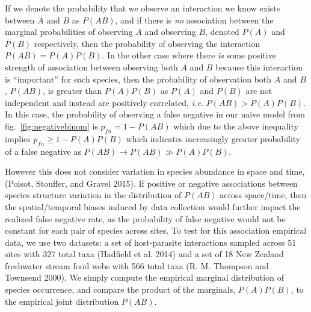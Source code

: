 \documentclass[10pt,oneside]{article}
\begin{document}
If we denote the probability that we observe an interaction we know
exists between \(A\) and \(B\) as \(P(AB)\), and if there is \emph{no}
association between the marginal probabilities of observing \(A\) and
observing \(B\), denoted \(P(A)\) and \(P(B)\) respectively, then the
probability of observing the interaction \(P(AB) = P(A)P(B)\). In the
other case where there \emph{is} some positive strength of association
between observing both \(A\) and \(B\) because this interaction is
``important'' for each species, then the probability of observation both
\(A\) and \(B\), \(P(AB)\), is greater than \(P(A)P(B)\) as \(P(A)\) and
\(P(B)\) are not independent and instead are positively correlated,
\emph{i.e.} \(P(AB) > P(A)P(B)\). In this case, the probability of
observing a false negative in our naive model from
fig.~\ref{fig:negativebinom} is \(p_{fn} = 1 - P(AB)\) which due to the
above inequality implies \(p_{fn} \geq 1 - P(A)P(B)\) which indicates
increasingly greater probability of a false negative as
\(P(AB) \to P(AB) \gg P(A)P(B)\).

However this does not consider variation in species abundance in space
and time, (Poisot, Stouffer, and Gravel 2015). If positive or negative
associations between species structure variation in the distribution of
\(P(AB)\) across space/time, then the spatial/temporal biases induced by
data collection would further impact the realized false negative rate,
as the probability of false negative would not be constant for each pair
of species across sites. To test for this association empirical data, we
use two datasets: a set of host-parasite interactions sampled across 51
sites with 327 total taxa (Hadfield et al. 2014) and a set of 18 New
Zealand freshwater stream food webs with 566 total taxa (R. M. Thompson
and Townsend 2000). We simply compute the empirical marginal
distribution of species occurrence, and compare the product of the
marginals, \(P(A)P(B)\), to the empirical joint distribution \(P(AB)\).
\end{document}
